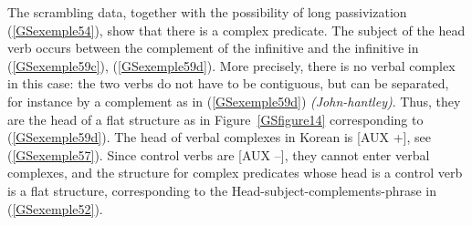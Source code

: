 \documentclass[output=paper
                ,modfonts
                ,nonflat
	        ,collection
	        ,collectionchapter
	        ,collectiontoclongg
 	        ,biblatex
                ,babelshorthands
                ,newtxmath
                ,draftmode
                ,colorlinks, citecolor=brown
]{./langsci/langscibook}
\begin{document}
{\eal
	\label{GSexemple59} 
	\label{GSexemple59a}
		
    \label{GSexemple59b}
		
	\label{GSexemple59c}
		
    \label{GSexemple59d}
\zl

The scrambling data, together with the possibility of long passivization (\ref{GSexemple54}), show that there is a complex predicate. The subject of the head verb occurs between the complement of the infinitive and the infinitive in (\ref{GSexemple59c}), (\ref{GSexemple59d}). More precisely, there is no verbal complex in this case: the two verbs do not have to be contiguous, but can be separated, for instance by a complement as in (\ref{GSexemple59d}) \emph{(John-hantley)}. Thus, they are the head of a flat structure as in Figure~\ref{GSfigure14} corresponding to (\ref{GSexemple59d}). The head of verbal complexes in Korean is [AUX +], see (\ref{GSexemple57}). Since control verbs are [AUX –], they cannot enter verbal complexes, and the structure for complex predicates whose head is a control verb is a flat structure, corresponding to the Head-subject-complements-phrase in (\ref{GSexemple52}). 


}
\end{document}
